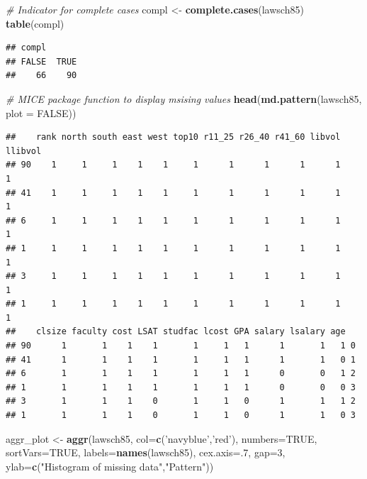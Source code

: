 \documentclass[]{book}
\newenvironment{Shaded}{\begin{snugshade}}{\end{snugshade}}
\newcommand{\CommentTok}[1]{\textcolor[rgb]{0.56,0.35,0.01}{\textit{#1}}}
\newcommand{\DataTypeTok}[1]{\textcolor[rgb]{0.13,0.29,0.53}{#1}}
\newcommand{\DecValTok}[1]{\textcolor[rgb]{0.00,0.00,0.81}{#1}}
\newcommand{\KeywordTok}[1]{\textcolor[rgb]{0.13,0.29,0.53}{\textbf{#1}}}
\newcommand{\NormalTok}[1]{#1}
\newcommand{\OtherTok}[1]{\textcolor[rgb]{0.56,0.35,0.01}{#1}}
\newcommand{\StringTok}[1]{\textcolor[rgb]{0.31,0.60,0.02}{#1}}
\begin{document}
\begin{Shaded}
\begin{Highlighting}[]
\CommentTok{# Indicator for complete cases}
\NormalTok{compl <-}\StringTok{ }\KeywordTok{complete.cases}\NormalTok{(lawsch85)}
\KeywordTok{table}\NormalTok{(compl)}
\end{Highlighting}
\end{Shaded}

\begin{verbatim}
## compl
## FALSE  TRUE 
##    66    90
\end{verbatim}

\begin{Shaded}
\begin{Highlighting}[]
\CommentTok{# MICE package function to display msising values }
\KeywordTok{head}\NormalTok{(}\KeywordTok{md.pattern}\NormalTok{(lawsch85, }\DataTypeTok{plot =} \OtherTok{FALSE}\NormalTok{)) }
\end{Highlighting}
\end{Shaded}

\begin{verbatim}
##    rank north south east west top10 r11_25 r26_40 r41_60 libvol llibvol
## 90    1     1     1    1    1     1      1      1      1      1       1
## 41    1     1     1    1    1     1      1      1      1      1       1
## 6     1     1     1    1    1     1      1      1      1      1       1
## 1     1     1     1    1    1     1      1      1      1      1       1
## 3     1     1     1    1    1     1      1      1      1      1       1
## 1     1     1     1    1    1     1      1      1      1      1       1
##    clsize faculty cost LSAT studfac lcost GPA salary lsalary age  
## 90      1       1    1    1       1     1   1      1       1   1 0
## 41      1       1    1    1       1     1   1      1       1   0 1
## 6       1       1    1    1       1     1   1      0       0   1 2
## 1       1       1    1    1       1     1   1      0       0   0 3
## 3       1       1    1    0       1     1   0      1       1   1 2
## 1       1       1    1    0       1     1   0      1       1   0 3
\end{verbatim}

\begin{Shaded}
\begin{Highlighting}[]
\NormalTok{aggr_plot <-}\StringTok{ }\KeywordTok{aggr}\NormalTok{(lawsch85, }\DataTypeTok{col=}\KeywordTok{c}\NormalTok{(}\StringTok{'navyblue'}\NormalTok{,}\StringTok{'red'}\NormalTok{), }\DataTypeTok{numbers=}\OtherTok{TRUE}\NormalTok{, }\DataTypeTok{sortVars=}\OtherTok{TRUE}\NormalTok{, }\DataTypeTok{labels=}\KeywordTok{names}\NormalTok{(lawsch85), }\DataTypeTok{cex.axis=}\NormalTok{.}\DecValTok{7}\NormalTok{, }\DataTypeTok{gap=}\DecValTok{3}\NormalTok{, }\DataTypeTok{ylab=}\KeywordTok{c}\NormalTok{(}\StringTok{"Histogram of missing data"}\NormalTok{,}\StringTok{"Pattern"}\NormalTok{))}
\end{Highlighting}
\end{Shaded}
\end{document}
